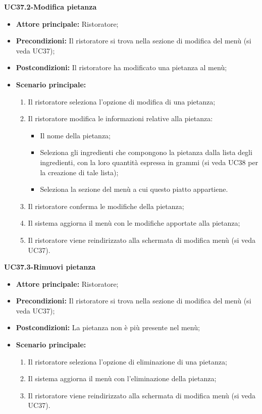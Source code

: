 \textbf{UC37.2-Modifica pietanza}
\begin{itemize}
    \item \textbf{Attore principale:} Ristoratore;
    \item \textbf{Precondizioni:} Il ristoratore si trova nella sezione di modifica del menù (si veda UC37);
    \item \textbf{Postcondizioni:} Il ristoratore ha modificato una pietanza al menù;
    \item \textbf{Scenario principale:}
    \begin{enumerate}
        \item Il ristoratore seleziona l'opzione di modifica di una pietanza;
        \item Il ristoratore modifica le informazioni relative alla pietanza:
        \begin{itemize}
            \item Il nome della pietanza;
            \item Seleziona gli ingredienti che compongono la pietanza dalla lista degli ingredienti, con la loro quantità espressa in grammi (si veda UC38 per la creazione di tale lista);
            \item Seleziona la sezione del menù a cui questo piatto appartiene.
        \end{itemize}
        \item Il ristoratore conferma le modifiche della pietanza;
        \item Il sistema aggiorna il menù con le modifiche apportate alla pietanza;
        \item Il ristoratore viene reindirizzato alla schermata di modifica menù (si veda UC37).
    \end{enumerate}
\end{itemize}

\textbf{UC37.3-Rimuovi pietanza}
\begin{itemize}
    \item \textbf{Attore principale:} Ristoratore;
    \item \textbf{Precondizioni:} Il ristoratore si trova nella sezione di modifica del menù (si veda UC37);
    \item \textbf{Postcondizioni:} La pietanza non è più presente nel menù;
    \item \textbf{Scenario principale:}
    \begin{enumerate}
        \item Il ristoratore seleziona l'opzione di eliminazione di una pietanza;
        \item Il sistema aggiorna il menù con l'eliminazione della pietanza;
        \item Il ristoratore viene reindirizzato alla schermata di modifica menù (si veda UC37).
    \end{enumerate}
\end{itemize}


